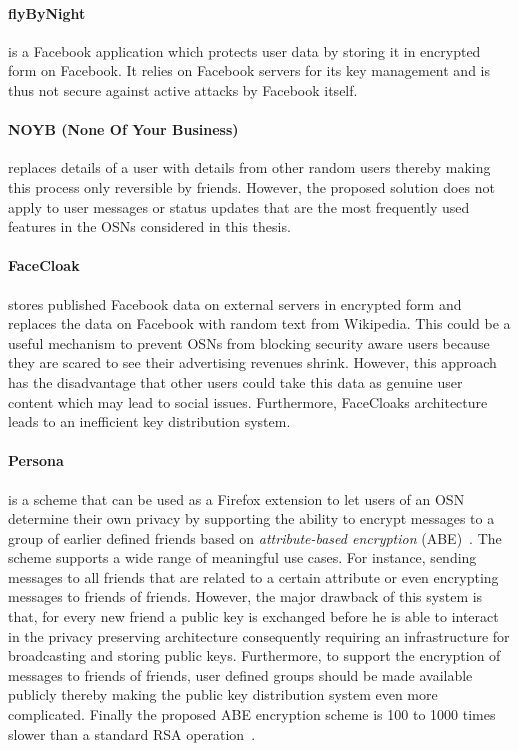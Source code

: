 \paragraph{flyByNight~\cite{art:LucasB09}} is a Facebook application which protects user data by storing it in encrypted form on Facebook. It relies on Facebook servers for its key management and is thus not secure against active attacks by Facebook itself.

\paragraph{NOYB (None Of Your Business)~\cite{art:GuhaSTF08}} replaces details of a user with details from other random users thereby making this process only reversible by friends. However, the proposed solution does not apply to user messages or status updates that are the most frequently used features in the OSNs considered in this thesis.

\paragraph{FaceCloak~\cite{art:LuoXH09}} stores published Facebook data on external servers in encrypted form and replaces the data on Facebook with random text from Wikipedia. This could be a useful mechanism to prevent OSNs from blocking security aware users because they are scared to see their advertising revenues shrink. However, this approach has the disadvantage that other users could take this data as genuine user content which may lead to social issues. Furthermore, FaceCloaks architecture leads to an inefficient key distribution system.

\paragraph{Persona~\cite{art:BadenBSBS09}} is a scheme that can be used as a Firefox extension to let users of an OSN determine their own privacy by supporting the ability to encrypt messages to a group of earlier defined friends based on \textit{attribute-based encryption} (ABE)~\cite{art:SahaiW04}. The scheme supports a wide range of meaningful use cases. For instance, sending messages to all friends that are related to a certain attribute or even encrypting messages to friends of friends. However, the major drawback of this system is that, for every new friend  a public key is exchanged before he is able to interact in the privacy preserving architecture consequently requiring an infrastructure for broadcasting and storing public keys. Furthermore, to support the encryption of messages to friends of friends, user defined groups should be made available publicly thereby making the public key distribution system even more complicated. Finally the proposed ABE encryption scheme is 100 to 1000 times slower than a standard RSA operation~\cite{art:BadenBSBS09}.

